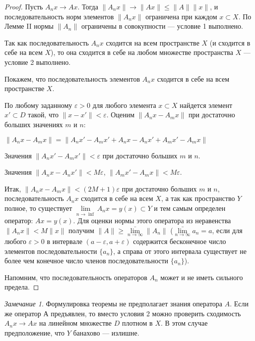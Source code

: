 \documentclass[12pt,a4paper,titlepage, oneside]{book}
\theoremstyle{definition}
\theoremstyle{plain}
\theoremstyle{remark}
\newtheorem*{remark}{Замечание}
\theoremstyle{remark}
\theoremstyle{remark}
\theoremstyle{remark}
\theoremstyle{plain}
\theoremstyle{plain}
\begin{document}
\begin{proof}
 Пусть $A_n x \to A x$. Тогда $\lVert A_n x\rVert \to \lVert A x\rVert \le \lVert A\rVert \lVert x\rVert$, и последовательность норм элементов $\lVert A_n x\rVert$ ограничена при каждом $x \subset X$. По Лемме II нормы $\lVert A_n\rVert$ ограничены в совокупности --- условие 1 выполнено.

Так как последовательность $A_n x$ сходится на всем пространстве $X$ (и сходится в себе на всем $X$), то она сходится в себе на любом множестве пространства $X$ --- условие 2 выполнено.

 Покажем, что последовательность элементов $A_n x$ сходится в себе на всем пространстве $X$.

По любому заданному $\varepsilon > 0$ для любого элемента $x \subset X$ найдется элемент $x' \subset D$ такой, что $\lVert x - x'\rVert < \varepsilon$. Оценим $\lVert A_n x - A_m x\rVert$ при достаточно больших значениях $m$ и $n$:

\begin{center}
$\lVert A_n x - A_m x\rVert = \lVert A_n x' - A_m x' + A_n x - A_n x' + A_m x' - A_m x\rVert$
\end{center}

Значения $\lVert A_n x' - A_m x'\rVert < \varepsilon$ при достаточно больших $m$ и $n$.

Значения $\lVert A_n x - A_n x'\rVert < M\varepsilon$, $\lVert A_m x' - A_m x\rVert < M\varepsilon$.

Итак, $\lVert A_n x - A_m x\rVert < (2M +1)\varepsilon$ при достаточно больших $m$ и $n$, последовательность $A_n x$ сходится в себе на всем $X$, а так как пространство $Y$ полное, то существует $\lim\limits_{n \to \inf} A_n x = y(x) \subset Y$ и тем самым определен оператор: $A x = y(x)$. Для оценки нормы этого оператора из неравенства $\lVert A_n x\rVert < M\lVert x\rVert$ получим $\lVert A\rVert \ge \bar{\lim\limits_{n \to \infty}}\lVert A_n\rVert$ ($\bar{\lim\limits_{n \to \infty}}a_n = a$, если для любого $\varepsilon > 0$ в интервале $(a-\varepsilon, a+\varepsilon)$ содержится бесконечное число элементов последовательности $\lbrace a_n\rbrace$, а справа от этого интервала существует не более чем конечное число членов последовательности $\lbrace a_n\rbrace$).

Напомним, что последовательность операторов $A_n$ может и не иметь сильного предела.
\end{proof}

\begin{remark}
Формулировка теоремы не предполагает знания оператора $A$. Если же оператор $А$ предъявлен, то вместо условия 2 можно проверить сходимость $A_n x\to A x$ на линейном множестве $D$ плотном в $X$. В этом случае предположение, что $Y$ банахово --- излишне.
\end{remark}
\end{document}
